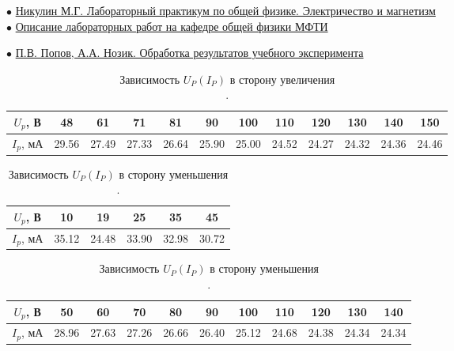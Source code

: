 $\bullet$ \href{https://vk.com/doc-139677307_612194888}{Никулин М.Г. Лабораторный практикум по общей физике. Электричество и магнетизм}\\

$\bullet$ \href{https://mipt.ru/education/chair/physics/S_III/lab_el.php}{Описание лабораторных работ на кафедре общей физики МФТИ}

$\bullet$ \href{https://vk.com/doc-139677307_612194961}{П.В. Попов, А.А. Нозик. Обработка результатов учебного эксперимента}

\begin{table}[h]
\centering
\begin{tabular}{|c|c|c|c|c|c|c|c|c|c|c|c|}
\hline
$U_p$, В & 48 & 61 & 71 & 81 & 90 & 100 & 110 & 120 & 130 & 140 & 150 \\ \hline
$I_p$, мА & 29.56 & 27.49 & 27.33 & 26.64 & 25.90 & 25.00 & 24.52 & 24.27 & 24.32 & 24.36 & 24.46  \\ \hline
\end{tabular}
\caption{Зависимость $U_P(I_P)$ в сторону увеличения\\.}
\end{table} 


\begin{table}[h]
\centering
\begin{tabular}{|c|c|c|c|c|c|}
\hline
$U_p$, В & 10 & 19 & 25 & 35 & 45 \\ \hline
$I_p$, мА & 35.12 & 24.48 & 33.90 & 32.98 & 30.72  \\ \hline
\end{tabular} 
\begin{tabular}{|c|c|c|c|c|c|c|c|c|c|c|}
\hline
$U_p$, В & 50 & 60 & 70 & 80 & 90 & 100 & 110 & 120 & 130 & 140 \\ \hline
$I_p$, мА & 28.96 & 27.63 & 27.26 & 26.66 & 26.40 & 25.12 & 24.68 & 24.38 & 24.34 & 24.34  \\ \hline
\end{tabular}
\caption{Зависимость $U_P(I_P)$ в сторону уменьшения\\.}
\end{table}


